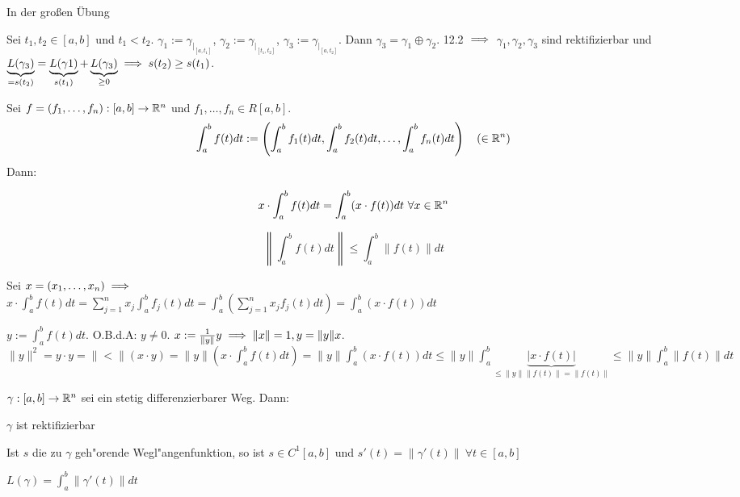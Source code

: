 \documentclass[a4paper,twoside,DIV15,BCOR12mm,chapterprefix=true,headings=twolinechapter]{scrbook}
\begin{document}
\begin{beweis}
\begin{liste}
\item In der großen Übung
\item Sei $t_1, t_2 \in [a,b]$ und $t_1<t_2$. $\gamma_1:=\gamma_{|_{[a,t_1]}}$, $\gamma_2:=\gamma_{|_{[t_1,t_2]}}$, $\gamma_3:=\gamma_{|_{[a,t_2]}}$. Dann $\gamma_3 = \gamma_1 \oplus \gamma_2$. 12.2 $\implies$ $\gamma_1,\gamma_2,\gamma_3$ sind rektifizierbar und $\underbrace{L(\gamma_3)}_{=s(t_2)} = \underbrace{L(\gamma1)}_{s(t_1)} + \underbrace{L(\gamma_3)}_{\ge 0} \implies s(t_2) \ge s(t_1)$.
\end{liste}
\end{beweis}

\begin{satz}
Sei $f=(f_1,\ldots,f_n):[a,b]\to\mathbb{R}^n$ und $f_1,\ldots,f_n\in R[a,b]$.
$$\int_a^bf(t)dt := \left(\int_a^bf_1(t)dt, \int_a^bf_2(t)dt,\ldots, \int_a^bf_n(t)dt\right) \quad (\in\mathbb{R}^n)$$
Dann: \begin{liste}
\item $$x\cdot \int_a^bf(t)dt = \int_a^b(x\cdot f(t))dt \ \forall x\in\mathbb{R}^n$$
\item $$\left\|\int_a^bf(t)dt\right\| \le \int_a^b\|f(t)\|dt$$
\end{liste}
\end{satz}

\begin{beweis}
\begin{liste}
\item Sei $x=(x_1,\ldots,x_n) \implies$\\ $x\cdot\int_a^b f(t)dt = \sum_{j=1}^n x_j\int_a^bf_j(t) dt = \int_a^b\left(\sum_{j=1}^n x_j f_j(t)dt\right) = \int_a^b \left(x\cdot f(t)\right) dt$
\item $y:=\int_a^bf(t)dt$. O.B.d.A: $y\ne 0$. $x:= \frac{1}{\|y\|} y \implies \|x\|=1, y=\|y\|x$. $\|y\|^2 = y\cdot y = \|<\|(x\cdot y) = \|y\|\left(x\cdot \int_a^bf(t)dt \right) = \|y\|\int_a^b\left(x\cdot f(t)\right) dt \le \|y\|\int_a^b\underbrace{|x \cdot f(t)|}_{\le\|y\|\|f(t)\| = \|f(t)\|} \le \|y\| \int_a^b\|f(t)\|dt$
\end{liste}
\end{beweis}


\begin{satz}
$\gamma:[a,b]\to\mathbb{R}^n$ sei ein stetig differenzierbarer Weg. Dann:
\begin{liste}
\item $\gamma$ ist rektifizierbar
\item Ist $s$ die zu $\gamma$ geh"orende Wegl"angenfunktion, so ist $s\in C^1[a,b]$ und $s'(t)=\|\gamma'(t)\|\ \forall t\in[a,b]$
\item $L(\gamma)=\int_a^b\|\gamma'(t)\|dt$
\end{liste}
\end{satz}
\end{document}
